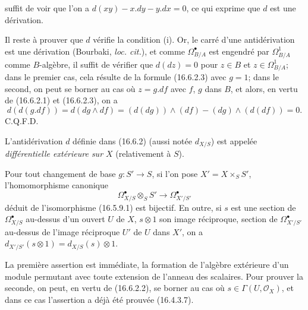 suffit de voir que l'on a $d(xy)-x.dy-y.dx=0$, ce qui exprime que $d$ est une
dérivation.

Il reste à prouver que $d$ vérifie la condition (i). Or, le carré d'une
antidérivation est une dérivation (Bourbaki, \emph{loc. cit.}), et comme
$\Omega_{B/A}^{\bullet}$ est engendré par $\Omega_{B/A}^1$ comme
$B$-algèbre, il suffit de vérifier que $d(dz)=0$ pour $z\in B$ et
$z\in\Omega_{B/A}^1$; dans le premier cas, cela résulte de la formule
(16.6.2.3) avec $g=1$; dans le second, on peut se borner au cas où $z=g.df$
avec $f$, $g$ dans $B$, et alors, en vertu de (16.6.2.1) et (16.6.2.3), on a
\[
  d(d(g.df))=d(dg\wedge df)
  =(d(dg))\wedge(df)-(dg)\wedge(d(df))=0.
\]
\hfill C.Q.F.D.

\begin{definition}[16.6.3]
L'antidérivation $d$ définie dans (16.6.2) (aussi notée $d_{X/S}$) est
appelée \emph{différentielle extérieure sur $X$} (relativement à $S$).
\end{definition}

\begin{proposition}[16.6.4]
\label{IV.16.6.4}
Pour tout changement de base $g:S'\to S$, si l'on pose
$X'=X\times_S S'$, l'homomorphisme canonique
\[
  \Omega_{X/S}^{\bullet}\otimes_S S'
  \longrightarrow\Omega_{X'/S'}^{\bullet}
  \tag{16.6.4.1}
  \label{IV.16.6.4.1}
\]
déduit de l'isomorphisme (16.5.9.1) est bijectif. En outre, si $s$ est une
section de $\Omega_{X/S}^{\bullet}$ au-dessus d'un ouvert $U$ de $X$,
$s\otimes1$ son image réciproque, section de $\Omega_{X'/S'}^{\bullet}$
au-dessus de l'image réciproque $U'$ de $U$ dans $X'$, on a
$d_{X'/S'}(s\otimes1)=d_{X/S}(s)\otimes1$.
\end{proposition}

La première assertion est immédiate, la formation de l'algèbre extérieure
d'un module permutant avec toute extension de l'anneau des scalaires. Pour
prouver la seconde, on peut, en vertu de (16.6.2.2), se borner au cas où
$s\in\Gamma(U,\mathcal{O}_X)$, et dans ce cas l'assertion a déjà été prouvée
(16.4.3.7).

